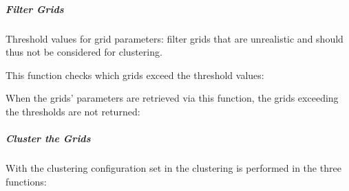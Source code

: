 \documentclass[letterpaper,10pt,english]{sphinxmanual}
\begin{document}
\sphinxstepscope


\subparagraph{Filter Grids}
\label{\detokenize{classification/classification_steps/filter_grids:filter-grids}}\label{\detokenize{classification/classification_steps/filter_grids::doc}}
\sphinxAtStartPar
Threshold values for grid parameters:
filter grids that are unrealistic and should thus not be considered for clustering.

\sphinxAtStartPar
This function checks which grids exceed the threshold values:

\sphinxAtStartPar
When the grids’ parameters are retrieved via this function, the grids exceeding the thresholds are not returned:

\sphinxstepscope


\subparagraph{Cluster the Grids}
\label{\detokenize{classification/classification_steps/clustering:cluster-the-grids}}\label{\detokenize{classification/classification_steps/clustering::doc}}
\sphinxAtStartPar
With the clustering configuration set in  the clustering is performed in the three functions:
\end{document}
